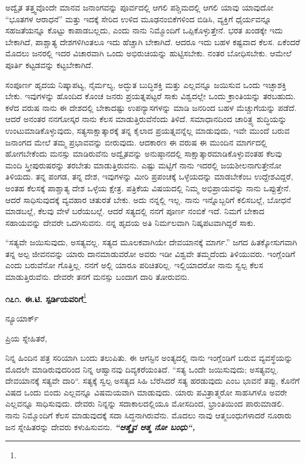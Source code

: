 ಅದ್ವೈತ ತತ್ತ್ವವೊಂದೇ ಮಾನವ ಜನಾಂಗವನ್ನು ಪೂರ್ವದಲ್ಲಿ ಆಗಲಿ ಪಶ್ಚಿಮದಲ್ಲಿ ಆಗಲಿ ಯಾವು ಯಾವುದೋ “ಭೂತಗಳ ಆರಾಧನೆ” ಮತ್ತು ಇದಕ್ಕೆ ಸೇರಿದ ಉಳಿದ ಮೂಢನಂಬಿಕೆಗಳಿಂದ ಬಿಡಿಸಿ, ವ್ಯಕ್ತಿಗೆ ಧೈರ್ಯವನ್ನೂ ಸಹಜತೆಯನ್ನೂ ಕೊಟ್ಟು ಕಾಪಾಡಬಲ್ಲದು, ಎಂದು ನಾನು ನಿಮ್ಮೊಂದಿಗೆ ಒಪ್ಪಿಕೊಳ್ಳುತ್ತೇನೆ. ಭರತ ಖಂಡಕ್ಕೇ ಇದು ಬೇಕಾಗಿದೆ, ಪಾಶ್ಚಾತ್ಯ ದೇಶಗಳಿಗಿಂತಲೂ ಇದು ಹೆಚ್ಚಾಗಿ ಬೇಕಾಗಿದೆ. ಆದರೂ ಇದು ಬಹಳ ಕಷ್ಟವಾದ ಕೆಲಸ. ಏಕೆಂದರೆ ಮೊದಲು ಜನರಲ್ಲಿ ಇದರ ವಿಚಾರವಾಗಿ ಒಂದು ಅಭಿರುಚಿಯನ್ನು ಹುಟ್ಟಿಸಬೇಕು. ನಂತರ ಬೋಧಿಸಬೇಕು. ಆಮೇಲೆ ಪೂರ್ತಿ ಕಟ್ಟಡವನ್ನು ಕಟ್ಟಬೇಕಾಗಿದೆ.

ಸಂಪೂರ್ಣ ಹೃದಯ ನಿಷ್ಕಾಪಟ್ಯ, ನೈರ್ಮಲ್ಯ, ಅದ್ಭುತ ಬುದ್ಧಿಶಕ್ತಿ ಮತ್ತು ಎಲ್ಲವನ್ನೂ ಜಯಿಸುವ ಒಂದು ಇಚ್ಛಾಶಕ್ತಿ ಬೇಕು. ಇವುಗಳನ್ನು ಹೊಂದಿದ ಕೊಂಚ ಜನರು ಪ್ರಯತ್ನಪಟ್ಟರೆ ಸಾಕು ವಿಶ್ವದಲ್ಲೇ ಒಂದು ಕ್ರಾಂತಿಯನ್ನು ತರಬಹುದು. ಕಳೆದ ವರುಷ ನಾನು ಈ ದೇಶದಲ್ಲಿ ಬೇಕಾದಷ್ಟು ಉಪನ್ಯಾಸಗಳನ್ನು ಮಾಡಿ ಜನರಿಂದ ಬಹಳ ಮೆಚ್ಚುಗೆಯನ್ನು ಪಡೆದೆ. ಆದರೆ ಅನಂತರ ನನಗೋಸ್ಕರ ನಾನು ಕೆಲಸ ಮಾಡುತ್ತಿರುವೆನೆಂದು ತಿಳಿದೆ. ಸಮಾಧಾನದಿಂದ ಚಾರಿತ್ರ್ಯ ಶುದ್ಧಿಯನ್ನು ಉಂಟುಮಾಡಿಕೊಳ್ಳುವುದು, ಸತ್ಯಸಾಕ್ಷಾತ್ಕಾರಕ್ಕೆ ತನ್ನ ಕೈಲಾದ ಪ್ರಯತ್ನವನ್ನೆಲ್ಲ ಮಾಡುವುದು, ಇವೇ ಮುಂದೆ ಬರುವ ಜನಾಂಗದ ಮೇಲೆ ತಮ್ಮ ಪ್ರಭಾವವನ್ನು ಬೀರುವುದು. ಆದಕಾರಣ ಈ ವರುಷ ಈ ಮುಂದಿನ ಮಾರ್ಗದಲ್ಲಿ ಹೋಗಬೇಕೆಂದು ಮನಸ್ಸು ಮಾಡಿರುವೆನು\enginline{-} ಅದ್ವೈತವನ್ನು ಅನುಷ್ಠಾನದಲ್ಲಿ ಸಾಕ್ಷಾತ್ಕಾರಮಾಡಿಕೊಳ್ಳುವಂತಹ ಕೆಲವು ಮಂದಿ ಸ್ತ್ರೀಪುರುಷರನ್ನು ತರಬೇತು ಮಾಡುತ್ತಿರುವನು. ಎಷ್ಟು ಮಟ್ಟಿಗೆ ನಾನು ಇದರಲ್ಲಿ ಜಯಶೀಲನಾಗುತ್ತೇನೋ ತಿಳಿಯದು. ತನ್ನ ಪಂಗಡ, ತನ್ನ ದೇಶ, ಇವುಗಳನ್ನು ಮೀರಿ ಪ್ರಪಂಚಕ್ಕೆ ಒಳ್ಳೆಯದನ್ನು ಮಾಡಬೇಕೆಂಬ ಉದ್ದೇಶವಿದ್ದರೆ, ಅಂತಹ ಕೆಲಸಕ್ಕೆ ಪಾಶ್ಚಾತ್ಯ ದೇಶ ಒಳ್ಳೆಯ ಕ್ಷೇತ್ರ. ಪತ್ರಿಕೆಯ ವಿಷಯದಲ್ಲಿ ನಿಮ್ಮ ಅಭಿಪ್ರಾಯವನ್ನು ನಾನು ಒಪ್ಪುತ್ತೇನೆ. ಆದರೆ ಸಾಧಿಸುವುದಕ್ಕೆ ವ್ಯವಹಾರ ಚತುರತೆ ಬೇಕು. ಅದು ನನ್ನಲ್ಲಿ ಇಲ್ಲ. ನಾನು ಇನ್ನೊಬ್ಬರಿಗೆ ಕಲಿಸಬಲ್ಲೆ, ಬೋಧನೆ ಮಾಡಬಲ್ಲೆ, ಕೆಲವು ವೇಳೆ ಬರೆಯಬಲ್ಲೆ. ಆದರೆ ಸತ್ಯದಲ್ಲಿ ನನಗೆ ಪೂರ್ಣ ನಂಬಿಕೆ ಇದೆ. ನಿಮಗೆ ಬೇಕಾದ ಸಹಾಯವನ್ನು ದೇವರೇ ಒದಗಿಸುವನು. ನನ್ನ ಹೃದಯ ಅತಿ ನಿರ್ಮಲವಾಗಿ ನಿಷ್ಕಪಟವಾಗಿದ್ದರೆ ಸಾಕು.

“ಸತ್ಯವೇ ಜಯಿಸುವುದು, ಅಸತ್ಯವಲ್ಲ. ಸತ್ಯದ ಮೂಲಕವಾಗಿಯೇ ದೇವಯಾನಕ್ಕೆ ಮಾರ್ಗ.” ಜಗದ ಹಿತಕ್ಕೋಸುಗವಾಗಿ ತನ್ನ ಅಲ್ಪ ಜೀವನವನ್ನು ಯಾರು ದಾನಮಾಡುವರೋ ಅವರು ಇಡೀ ವಿಶ್ವವೇ ತಮ್ಮದೆಂದು ತಿಳಿಯುವರು. ಇಂಗ್ಲೆಂಡಿಗೆ ಎಂದು ಬರುವೆನೋ ಗೊತ್ತಿಲ್ಲ. ನನಗೆ ಅಲ್ಲಿ ಯಾರೂ ಪರಿಚಿತರಿಲ್ಲ. ಇಲ್ಲಿಯಾದರೋ ನಾನು ಸ್ವಲ್ಪ ಕೆಲಸ ಮಾಡುತ್ತಿರುವೆನು. ದೇವರೇ ತನಗೆ ಮನಸ್ಸು ಬಂದಾಗ ದಾರಿ ತೋರುವನು.

\begin{center}
\textbf{೧೭೧. ಈ.ಟಿ. ಸ್ಪರ್ಡಿಯವರಿಗೆ}\footnote{}
\end{center}

\begin{flushright}
ನ್ಯೂಯಾರ್ಕ್
\end{flushright}

\noindent
ಪ್ರಿಯ ಸ್ನೇಹಿತರೆ,

ನಿನ್ನ ಹಿಂದಿನ ಪತ್ರ ಸರಿಯಾಗಿ ಬಂದು ತಲುಪಿತು. ಈ ಆಗಸ್ಟಿನ ಅಂತ್ಯದಲ್ಲಿ ನಾನು ಇಂಗ್ಲೆಂಡಿಗೆ ಬರುವ ವ್ಯವಸ್ಥೆಯನ್ನು ಮೊದಲೇ ಮಾಡಿರುವುದರಿಂದ ನಿನ್ನ ಆಹ್ವಾನವು ದಿವ್ಯಕರೆಯಂತಿದೆ. “ಸತ್ಯ ಒಂದೇ ಜಯಿಸುವುದು; ಅಸತ್ಯವಲ್ಲ. ದೇವಯಾನಕ್ಕೆ ಸತ್ಯವೇ ದಾರಿ“. ಸತ್ಯಕ್ಕೆ ಸ್ವಲ್ಪ ಅಸತ್ಯದ ಸಿಹಿ ಬೆರೆಸಿದರೆ ಸತ್ಯ ಹರಡುವುದು ಎಂಬ ಭಾವನೆ ತಪ್ಪು, ಕೊನೆಗೆ ವಿಷದ ಒಂದು ಬಿಂದು ಎಲ್ಲವನ್ನೂ ವಿಷಮಯವಾಗಿ ಮಾಡುವುದು. ಯಾರು ಪವಿತ್ರಾತ್ಮರೋ ಸಾಹಸಿಗಳೊ ಅವರೇ ಎಲ್ಲವನ್ನೂ ಸಾಧಿಸುವುದು. ದೇವರು ನಿನ್ನನ್ನು ಸದಾಕಾಲದಲ್ಲಿಯೂ ಮೋಸದಿಂದ, ಭ್ರಾಂತಿಯಿಂದ ಪಾರುಮಾಡಲಿ. ನಾನು ನಿಮ್ಮೊಂದಿಗೆ ಕೆಲಸ ಮಾಡುವುದಕ್ಕೆ ಸದಾ ಸಿದ್ಧನಾಗಿರುವೆನು. ಮೊದಲು ನಾವು ಆತ್ಮಬಂಧುಗಳಾದರೆ ನೂರಾರು ಜನ ಸ್ನೇಹಿತರನ್ನು ದೇವರು ಕಳುಹಿಸುವನು. \textbf{\textit{“ಆತ್ಮೈವ ಆತ್ಮ ನೋ ಬಂಧು“, }}

